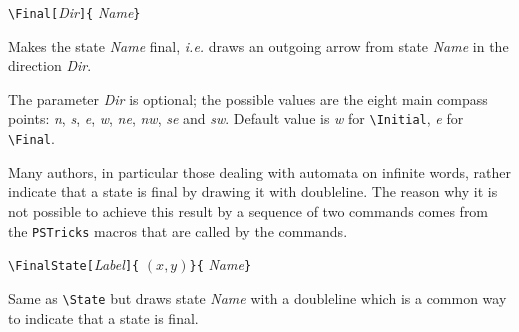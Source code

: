 \documentclass[11pt,twoside]{article}
\newlength{\ColoText}%
\newlength{\ColoFigu}%
\newlength{\parindenttemp} %
\newcommand{\noi}{\noindent}
\newcommand{\ie}{{\itshape i.e.}\xspace }
\newlength{\jsIndent}%
\newcommand{\PSTricks}{\texttt{PSTricks}\xspace}
\begin{document}
\medskip 
\noi 
\hspace*{-\jsIndent}
\begin{minipage}[t]{\ColoText}
        \par\vspace*{0mm}%
        \footnotesize
\verb+\Final[+\textsl{Dir}\verb+]{+%
   \textsl{Name}\verb+}+
\normalsize
\end{minipage}%
\hspace*{1.2em}%
\begin{minipage}[t]{\ColoFigu}%
\par\vspace*{0mm}%
Makes the state \textsl{Name} final, \ie  draws an outgoing arrow 
from state {\sl Name} in the direction \textsl{Dir}.
\end{minipage}%

\medskip 
\noi 
The parameter \textsl{Dir} is optional; the possible values are the 
eight main
compass points: {\sl n}, {\sl s}, {\sl e}, {\sl w}, {\sl ne}, {\sl 
nw}, {\sl se} and {\sl sw}. 
Default value is {\sl w} for \verb+\Initial+, 
{\sl e} for \verb+\Final+.

Many authors, in particular those dealing with automata on infinite words,
rather indicate that a state is final by drawing it with doubleline.
The reason why it is not possible to achieve this result by a sequence of
two commands comes from the \PSTricks macros that are called by the \VCSG
commands.

\medskip
\noi 
\hspace*{-\jsIndent}
\begin{minipage}[t]{\ColoText}
        \par\vspace*{0mm}%
        \footnotesize
\verb+\FinalState[+\textsl{Label}\verb+]{+%
   $(x,y)$\verb+}{+%
   \textsl{Name}\verb+}+
\normalsize
\end{minipage}%
\hspace*{1.2em}%
\begin{minipage}[t]{\ColoFigu}%
\par\vspace*{0mm}%
Same as \verb+\State+ but draws state \textsl{Name} 
with a doubleline which is a common way to indicate that a state is final.
\end{minipage}%
\medskip
\end{document}
